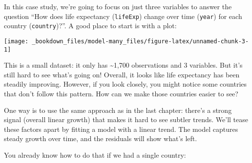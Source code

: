 \documentclass[]{book}
\newenvironment{Shaded}{\begin{snugshade}}{\end{snugshade}}
\newcommand{\KeywordTok}[1]{\textcolor[rgb]{0.13,0.29,0.53}{\textbf{{#1}}}}
\newcommand{\DataTypeTok}[1]{\textcolor[rgb]{0.13,0.29,0.53}{{#1}}}
\newcommand{\DecValTok}[1]{\textcolor[rgb]{0.00,0.00,0.81}{{#1}}}
\newcommand{\StringTok}[1]{\textcolor[rgb]{0.31,0.60,0.02}{{#1}}}
\newcommand{\NormalTok}[1]{{#1}}
\begin{document}
In this case study, we're going to focus on just three variables to
answer the question ``How does life expectancy (\texttt{lifeExp}) change
over time (\texttt{year}) for each country (\texttt{country})?''. A good
place to start is with a plot:

\begin{Shaded}
\end{Shaded}

\begin{center}\texttt{[image: \_bookdown\_files/model-many\_files/figure-latex/unnamed-chunk-3-1]} \end{center}

This is a small dataset: it only has \textasciitilde{}1,700 observations
and 3 variables. But it's still hard to see what's going on! Overall, it
looks like life expectancy has been steadily improving. However, if you
look closely, you might notice some countries that don't follow this
pattern. How can we make those countries easier to see?

One way is to use the same approach as in the last chapter: there's a
strong signal (overall linear growth) that makes it hard to see subtler
trends. We'll tease these factors apart by fitting a model with a linear
trend. The model captures steady growth over time, and the residuals
will show what's left.

You already know how to do that if we had a single country:
\end{document}
